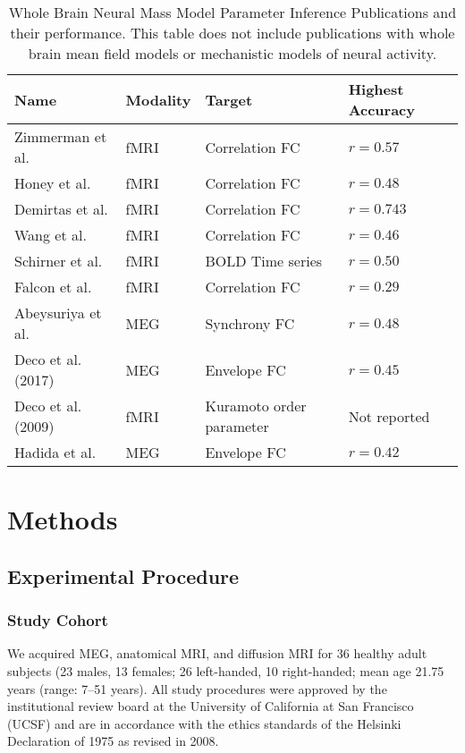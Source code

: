 \begin{table}
 \caption{Whole Brain Neural Mass Model Parameter Inference Publications and their performance. This table does not include publications with whole brain mean field models or mechanistic models of neural activity. }
  \centering
  \begin{tabular}{llll}
    \toprule
    \cmidrule(r){1-2}
    Name & Modality  & Target  & Highest Accuracy \\
    \midrule
    Zimmerman et al. \cite{Zimmermann2018} & fMRI & Correlation FC & $r=0.57$  \\
    Honey et al. \cite{honey_predicting_2009} & fMRI & Correlation FC & $ r=0.48$ \\
    Demirtas et al. \cite{demirtas_hierarchical_2019} & fMRI & Correlation FC & $r=0.743$ \\
    Wang et al. \cite{wang_inversion_2019} & fMRI & Correlation FC & $r=0.46$ \\
    Schirner et al. \cite{schirner_inferring_2018} & fMRI & BOLD Time series & $r=0.50$ \\
    Falcon et al. \cite{falcon_virtual_2015} & fMRI  & Correlation FC  &  $r = 0.29$  \\
    Abeysuriya et al. \cite{abeysuriya_biophysical_2018} & MEG & Synchrony FC & $r = 0.48$ \\
    Deco et al. (2017) \cite{deco_single_2017}  & MEG & Envelope FC & $r=0.45$ \\
    Deco et al. (2009) \cite{Deco2009} & fMRI & Kuramoto order parameter & Not reported \\
    Hadida et al. \cite{hadida_bayesian_2018} & MEG & Envelope FC & $r=0.42$ \\
    \bottomrule
  \end{tabular}
  \label{tab:nmm_pubs}
\end{table}

\section{Methods}

\subsection{Experimental Procedure}

\subsubsection{Study Cohort}
We acquired MEG, anatomical MRI, and diffusion MRI for 36 healthy adult subjects (23 males, 13 females; 26 left-handed, 10 right-handed; mean age 21.75 years (range: 7–51 years). All study procedures were approved by the institutional review board at the University of California at San Francisco (UCSF) and are in accordance with the ethics standards of the Helsinki Declaration of 1975 as revised in 2008.

